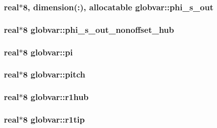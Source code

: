\subsubsection[{phi\+\_\+s\+\_\+out}]{\setlength{\rightskip}{0pt plus 5cm}real$\ast$8, dimension(\+:), allocatable globvar\+::phi\+\_\+s\+\_\+out}\label{namespaceglobvar_a9a3ae0b7ec948af43ece3fee824e7da2}
\hypertarget{namespaceglobvar_ae4db55071c0a99b6d91729452cf5e5bc}{}
\subsubsection[{phi\+\_\+s\+\_\+out\+\_\+nonoffset\+\_\+hub}]{\setlength{\rightskip}{0pt plus 5cm}real$\ast$8 globvar\+::phi\+\_\+s\+\_\+out\+\_\+nonoffset\+\_\+hub}\label{namespaceglobvar_ae4db55071c0a99b6d91729452cf5e5bc}
\hypertarget{namespaceglobvar_a201c98f02f6744953f40e1c007630bc0}{}
\subsubsection[{pi}]{\setlength{\rightskip}{0pt plus 5cm}real$\ast$8 globvar\+::pi}\label{namespaceglobvar_a201c98f02f6744953f40e1c007630bc0}
\hypertarget{namespaceglobvar_ae18c6278744d9db850158672b4cbd5ea}{}
\subsubsection[{pitch}]{\setlength{\rightskip}{0pt plus 5cm}real$\ast$8 globvar\+::pitch}\label{namespaceglobvar_ae18c6278744d9db850158672b4cbd5ea}
\hypertarget{namespaceglobvar_a23bf2eee6718016ef422ea6f1a96774a}{}
\subsubsection[{r1hub}]{\setlength{\rightskip}{0pt plus 5cm}real$\ast$8 globvar\+::r1hub}\label{namespaceglobvar_a23bf2eee6718016ef422ea6f1a96774a}
\hypertarget{namespaceglobvar_a925bcdc500de307bc4848f7ddc9a2574}{}
\subsubsection[{r1tip}]{\setlength{\rightskip}{0pt plus 5cm}real$\ast$8 globvar\+::r1tip}\label{namespaceglobvar_a925bcdc500de307bc4848f7ddc9a2574}
\hypertarget{namespaceglobvar_acdf6123c5a99341b8318439c395573a5}{}
